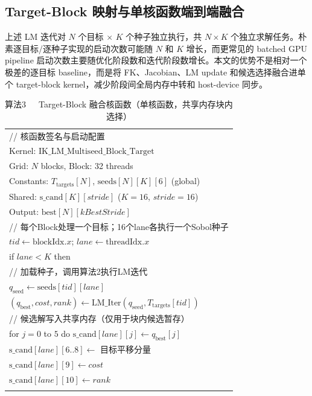 \documentclass[twocolumn,a4paper,10pt]{ctexart}
\makeatletter
\newenvironment{algotable}[2]{%
  \begin{table}[htbp]
  \centering
  \caption{#2}
  \label{#1}
  \footnotesize\ttfamily
  \begin{tabular}{@{}p{\columnwidth}@{}}
  \toprule
}{%
  \\\bottomrule
  \end{tabular}
  \end{table}
}
\makeatother
\begin{document}
\subsection{Target-Block 映射与单核函数端到端融合}

上述 LM 迭代对 $N$ 个目标 $\times$ $K$ 个种子独立执行，共 $N\times K$ 个独立求解任务。朴素逐目标/逐种子实现的启动次数可能随 $N$ 和 $K$ 增长，而更常见的 batched GPU pipeline 启动次数主要随优化阶段数和迭代阶段数增长。本文的优势不是相对一个极差的逐目标 baseline，而是将 FK、Jacobian、LM update 和候选选择融合进单个 target-block kernel，减少阶段间全局内存中转和 host-device 同步。

\begin{algotable}{alg:kernel}{算法3~~~Target-Block 融合核函数（单核函数，共享内存块内选择）}
// 核函数签名与启动配置\\
Kernel: $\mathrm{IK\_LM\_Multiseed\_Block\_Target}$\\
Grid: $N$ blocks, Block: 32 threads\\
Constants: $T_{\mathrm{targets}}[N]$, $\mathrm{seeds}[N][K][6]$ (global)\\
Shared: $\mathrm{s\_cand}[K][\textit{stride}]$ ($K{=}16$, $\textit{stride}{=}16$)\\
Output: $\mathrm{best}[N][\textit{kBestStride}]$\\[2pt]
// 每个Block处理一个目标；16个lane各执行一个Sobol种子\\
\quad $\textit{tid}\leftarrow\mathrm{blockIdx}.x$; $\textit{lane}\leftarrow\mathrm{threadIdx}.x$\\
\quad if $\textit{lane}<K$ then\\
// 加载种子，调用算法2执行LM迭代\\
\qquad $q_{\mathrm{seed}}\leftarrow\mathrm{seeds}[\textit{tid}][\textit{lane}]$\\
\qquad $(q_{\mathrm{best}},\textit{cost},\textit{rank})\leftarrow\mathrm{LM\_Iter}(q_{\mathrm{seed}},T_{\mathrm{targets}}[\textit{tid}])$\\
// 候选解写入共享内存（仅用于块内候选暂存）\\
\qquad for $j=0$ to $5$ do $\mathrm{s\_cand}[\textit{lane}][j]\leftarrow q_{\mathrm{best}}[j]$\\
\qquad $\mathrm{s\_cand}[\textit{lane}][6..8]\leftarrow$ 目标平移分量\\
\qquad $\mathrm{s\_cand}[\textit{lane}][9]\leftarrow\textit{cost}$\\
\qquad $\mathrm{s\_cand}[\textit{lane}][10]\leftarrow\textit{rank}$\\

\end{algotable}
\end{document}
